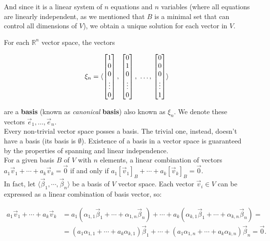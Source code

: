 And since it is a linear system of $n$ equations and $n$ variables (where all equations are linearly independent, as we mentioned that ${B}$ is a minimal set that can control all dimensions of $V$), we obtain a unique solution for each vector in $V$.


For each $\mathbb{R}^n$ vector space, the vectors 

$$\xi_n = \langle \begin{bmatrix} 1 \\ 0 \\ 0 \\ \vdots \\ 0\end{bmatrix}, \\ \begin{bmatrix} 0 \\ 1 \\ 0 \\ \vdots \\ 0\end{bmatrix}, \ \dots, \\\begin{bmatrix} 0 \\ 0 \\ 0 \\ \vdots \\ 1\end{bmatrix}\rangle$$ 

are a \textbf{basis} (known as \emph{canonical} \textbf{basis}) also known as $\xi_n$. We denote these vectors $\vec{e}_1, \dots, \vec{e}_n$.
\\

Every non-trivial vector space posses a basis. The trivial one, instead, doesn't have a basis (its basis is $\emptyset$). Existence of a basis in a vector space is guaranteed by the properties of spanning and linear independence.
\\

For a given basis $B$ of $V$ with $n$ elements, a linear combination of vectors $a_1 \vec v_1 + \cdots + a_k \vec v_k= \vec 0$ if and only if $a_1 [\vec v_1]_B + \cdots + a_k [\vec v_k]_B = \vec 0$.
\\

In fact, let $\langle \vec \beta_1, \cdots, \vec \beta_n \rangle$ be a basis of $V$ vector space. Each vector $\vec v_i \in V$ can be expressed as a linear combination of basis vector, so:

\begin{align*}
a_1 \vec v_1 + \cdots + a_k \vec v_k &= a_1 (\alpha_{1,1} \vec \beta_1 + \cdots + \alpha_{1,n} \vec \beta_n) + \cdots + a_k (\alpha_{k,1} \vec \beta_1 + \cdots + \alpha_{k,n} \vec \beta_n) = \\
&=(a_1 \alpha_{1,1} + \cdots + a_k \alpha_{k,1}) \vec \beta_1 + \cdots + (a_1 \alpha_{1,n} + \cdots + a_k \alpha_{k,n}) \vec \beta_n = \vec 0.
\end{align*}

